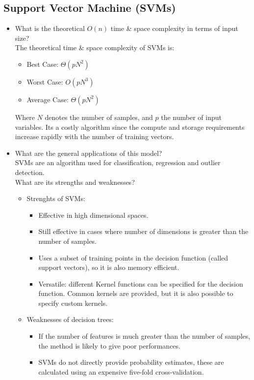 \documentclass[12pt]{article}
\begin{document}
\subsection*{Support Vector Machine (SVMs)}
\begin{itemize}
\item What is the theoretical $O(n)$ time \& space complexity in terms of input size?\\
The theoretical time \& space complexity of SVMs is:
\begin{itemize}[noitemsep,nolistsep]
\item Best Case: $\Theta(pN^2)$ 
\item Worst Case: $O(pN^3)$
\item Average Case: $\Theta(pN^2)$
\end{itemize}
Where $N$ denotes the number of samples, and $p$ the number of input variables. 
Its a costly algorithm since the compute and storage requirements increase rapidly with the number of training vectors.

\item What are the general applications of this model?\\ 
SVMs are an algorithm used for classification, regression and outlier detection.\\
What are its strengths and weaknesses?
\begin{itemize}
       \item Strenghts of SVMs:
              \begin{itemize}[noitemsep,nolistsep]
                     \item Effective in high dimensional spaces.
                     \item Still effective in cases where number of dimensions is greater than the number of samples.
                     \item Uses a subset of training points in the decision function (called support vectors), so it is also memory efficient.
                     \item Versatile: different Kernel functions can be specified for the decision function. Common kernels are provided, but it is also possible to specify custom kernels.
              \end{itemize}
       \item Weaknesses of decision trees:
              \begin{itemize}[noitemsep,nolistsep]
                     \item If the number of features is much greater than the number of samples, the method is likely to give poor performances.
                     \item SVMs do not directly provide probability estimates, these are calculated using an expensive five-fold cross-validation.
              \end{itemize}
       \end{itemize}


\end{itemize}
\end{document}
